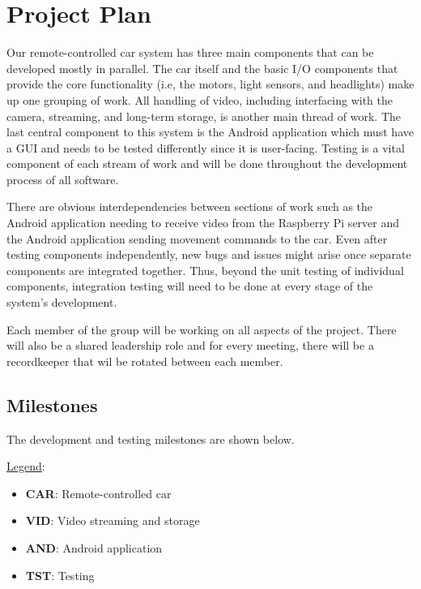 \documentclass[letterpaper,12pt]{report}
\begin{document}
	\section*{Project Plan}
	\markright{}
	Our remote-controlled car system has three main components that can be
	developed mostly in parallel. The car itself and the basic I/O components
	that provide the core functionality (i.e, the motors, light sensors, and
	headlights) make up one grouping of work. All handling of video, including
	interfacing with the camera, streaming, and long-term storage, is another
	main thread of work. The last central component to this system is the
	Android application which must have a GUI and needs to be tested differently
	since it is user-facing. Testing is a vital component of each stream of work
	and will be done throughout the development process of all software.

	There are obvious interdependencies between sections of work such as the
	Android application needing to receive video from the Raspberry Pi server
	and the Android application sending movement commands to the car. Even after
	testing components independently, new bugs and issues might arise once
	separate components are integrated together. Thus, beyond the unit testing
	of individual components, integration testing will need to be done at every
	stage of the system’s development.

	Each member of the group will be working on all aspects of the project.
	There will also be a shared leadership role and for every meeting, there
	will be a recordkeeper that wil be rotated between each member.

	\subsection*{Milestones}
	\markright{}
	The development and testing milestones are shown below.\par

	\underline{Legend}:

	\setlength{\parskip}{0em}
	\setlength{\baselineskip}{1em}

	\begin{itemize}
		\item[] \textbf{CAR}: Remote-controlled car
		\item[] \textbf{VID}: Video streaming and storage
		\item[] \textbf{AND}: Android application
		\item[] \textbf{TST}: Testing
	\end{itemize}\vspace{1em}
\end{document}
